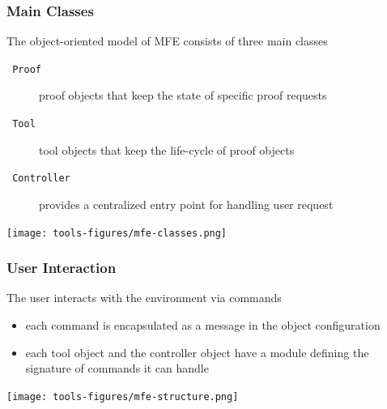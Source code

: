 \documentclass[xcolor=dvipsnames,10pt]{beamer}
\begin{document}
\begin{frame}[fragile]
  \frametitle{Main Classes}

  The object-oriented model of MFE consists of three main classes

  \begin{description}
    \item[\texttt{  \small Proof}] proof objects that keep the state of specific proof requests
    \item[\texttt{  \small Tool}] tool objects that keep the life-cycle of proof objects
    \item[\texttt{  \small Controller}] provides a centralized entry point for handling user request
  \end{description}

\smallskip

\begin{center}
\texttt{[image: tools-figures/mfe-classes.png]}
\end{center}

\end{frame}

\begin{frame}[fragile]
  \frametitle{User Interaction}

  The user interacts with the environment via commands
\smallskip
\begin{minipage}{0.45\linewidth}
  \begin{itemize}
    \item each command is encapsulated as a message in the object configuration
    \item each tool object and the controller object have a module defining the
      signature of commands it can handle
  \end{itemize}
\end{minipage}
\begin{minipage}{0.45\linewidth}
\begin{center}
\texttt{[image: tools-figures/mfe-structure.png]}
\end{center}
\end{minipage}
\end{frame}
\end{document}
